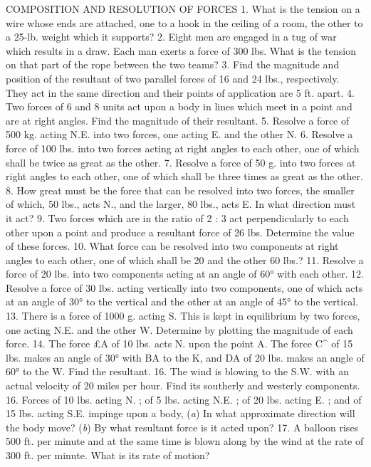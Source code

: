 COMPOSITION AND RESOLUTION OF FORCES
1. What is the tension on a wire whose ends are attached, one to a hook in the ceiling of a room, the other to a 25-lb. weight which it supports?
2. Eight men are engaged in a tug of war which results in a draw. Each man exerts a force of 300 lbs. What is the tension on that part of the rope between the two teams?
3. Find the magnitude and position of the resultant of two parallel forces of 16 and 24 lbs., respectively. They act in the same direction and their points of application are 5 ft. apart.
4. Two forces of 6 and 8 units act upon a body in lines which meet in a point and are at right angles. Find the magnitude of their resultant.
5. Resolve a force of 500 kg. acting N.E. into two forces, one acting E. and the other N.
6. Resolve a force of 100 lbs. into two forces acting at right angles to each other, one of which shall be twice as great as the other.
7. Resolve a force of 50 g. into two forces at right angles to each other, one of which shall be three times as great as the other.
8. How great must be the force that can be resolved into two forces, the smaller of which, 50 lbs., acts N., and the larger, 80 lbs., acts E. In what direction must it act?
9. Two forces which are in the ratio of 2 : 3 act perpendicularly to each other upon a point and produce a resultant force of 26 lbs. Determine the value of these forces.
10. What force can be resolved into two components at right angles to each other, one of which shall be 20 and the other 60 lbs.?
11. Resolve a force of 20 lbs. into two components acting at an angle of 60° with each other.
12. Resolve a force of 30 lbs. acting vertically into two components, one of which acts at an angle of 30° to the vertical and the other at an angle of 45° to the vertical.
13. There is a force of 1000 g. acting S. This is kept in equilibrium by two forces, one acting N.E. and the other W. Determine by plotting the magnitude of each force.
14. The force £A of 10 lbs. acts N. upon the point A. The force C^ of 15 lbs. makes an angle of 30° with BA to the K, and DA of 20 lbs. makes an angle of 60° to the W. Find the resultant.
16. The wind is blowing to the S.W. with an actual velocity of 20 miles per hour. Find its southerly and westerly components.
16. Forces of 10 lbs. acting N. ; of 5 lbs. acting N.E. ; of 20 lbs. acting E. ; and of 15 lbs. acting S.E. impinge upon a body, (\emph{a}) In what approximate direction will the body move? (\emph{b}) By what resultant force is it acted upon?
17. A balloon rises 500 ft. per minute and at the same time is blown along by the wind at the rate of 300 ft. per minute. What is its rate of motion?
